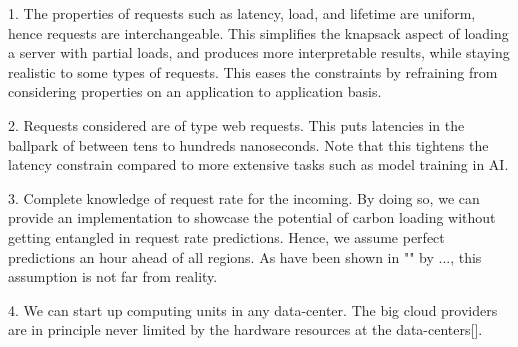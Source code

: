 



1. The properties of requests such as latency, load, and lifetime are uniform, hence requests are interchangeable. This simplifies the knapsack aspect of loading a server with partial loads, and produces more interpretable results, while staying realistic to some types of requests. This eases the constraints by refraining from considering properties on an application to application basis. 

2. Requests considered are of type web requests. This puts latencies in the ballpark of between tens to hundreds nanoseconds. Note that this tightens the latency constrain compared to more extensive tasks such as model training in AI.     


3. Complete knowledge of request rate for the incoming. By doing so, we can provide an implementation to showcase the potential of carbon loading without getting entangled in request rate predictions. Hence, we assume perfect predictions an hour ahead of all regions. As have been shown in "" by ..., this assumption is not far from reality. 

4. We can start up computing units in any data-center. The big cloud providers are in principle never limited by the hardware resources at the data-centers[]. %



